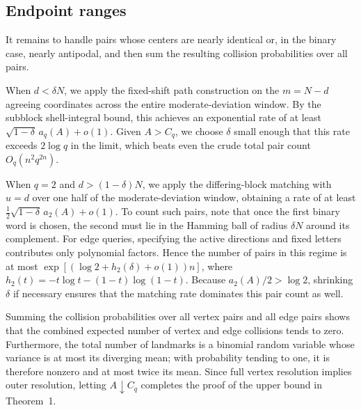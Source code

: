 \subsection{Endpoint ranges}
It remains to handle pairs whose centers are nearly identical or, in the binary case, nearly antipodal, and then sum the resulting collision probabilities over all pairs.

When $d<\delta N$, we apply the fixed-shift path construction on the $m=N-d$ agreeing coordinates across the entire moderate-deviation window. By the subblock shell-integral bound, this achieves an exponential rate of at least $\sqrt{1-\delta}\,a_q(A)+o(1)$. Given $A>C_q$, we choose $\delta$ small enough that this rate exceeds $2\log q$ in the limit, which beats even the crude total pair count $O_q(n^2q^{2n})$.

When $q=2$ and $d>(1-\delta)N$, we apply the differing-block matching with $u=d$ over one half of the moderate-deviation window, obtaining a rate of at least $\frac12\sqrt{1-\delta}\,a_2(A)+o(1)$. To count such pairs, note that once the first binary word is chosen, the second must lie in the Hamming ball of radius $\delta N$ around its complement. For edge queries, specifying the active directions and fixed letters contributes only polynomial factors. Hence the number of pairs in this regime is at most $\exp[(\log2+h_2(\delta)+o(1))n]$, where $h_2(t)=-t\log t-(1-t)\log(1-t)$. Because $a_2(A)/2>\log2$, shrinking $\delta$ if necessary ensures that the matching rate dominates this pair count as well.

Summing the collision probabilities over all vertex pairs and all edge pairs shows that the combined expected number of vertex and edge collisions tends to zero. Furthermore, the total number of landmarks is a binomial random variable whose variance is at most its diverging mean; with probability tending to one, it is therefore nonzero and at most twice its mean. Since full vertex resolution implies outer resolution, letting $A\downarrow C_q$ completes the proof of the upper bound in Theorem~1.
